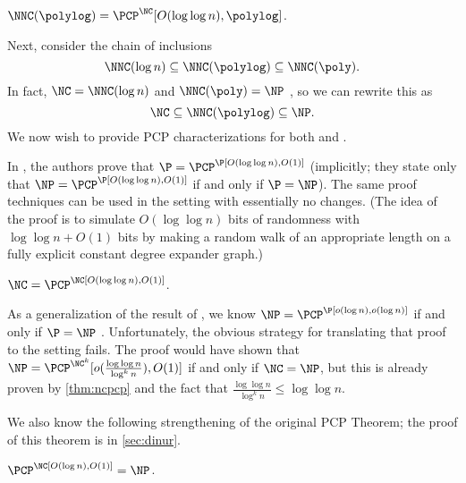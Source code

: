 \documentclass{article}
\newcommand{\loglog}{\log\log}
\begin{document}
\begin{corollary}\label{cor:polylogeq}
  $\NNC(\polylog) = \PCP^{\NC}[O(\loglog n), \polylog]$.
\end{corollary}

Next, consider the chain of inclusions
\begin{equation*}
  \NNC(\log n) \subseteq \NNC(\polylog) \subseteq \NNC(\poly).
\end{equation*}
In fact, $\NC = \NNC(\log n)$ and $\NNC(\poly) = \NP$ \autocite{wolf94}, so we can rewrite this as
\begin{equation}\label{eq:chain}
  \NC \subseteq \NNC(\polylog) \subseteq \NP.
\end{equation}
We now wish to provide \NC{} PCP characterizations for both \NC{} and \NP{}.

In \autocite{fs96}, the authors prove that $\P = \PCP^\P[O(\loglog n), O(1)]$ (implicitly; they state only that $\NP = \PCP^\P[O(\loglog n), O(1)]$ if and only if $\P = \NP$).
The same proof techniques can be used in the \NC{} setting with essentially no changes.
(The idea of the proof is to simulate $O(\loglog n)$ bits of randomness with $\loglog n + O(1)$ bits by making a random walk of an appropriate length on a fully explicit constant degree expander graph.)

\begin{theorem}\label{thm:ncpcp}
  $\NC = \PCP^\NC[O(\loglog n), O(1)]$.
\end{theorem}

As a generalization of the result of \autocite{fs96}, we know $\NP = \PCP^\P[o(\log n), o(\log n)]$ if and only if $\P = \NP$ \autocites{as98}{fglss91}.
Unfortunately, the obvious strategy for translating that proof to the \NC{} setting fails.
The proof would have shown that $\NP = \PCP^{\NC^k}[o(\frac{\loglog n}{\log^k n}), O(1)]$ if and only if $\NC = \NP$, but this is already proven by \autoref{thm:ncpcp} and the fact that $\frac{\loglog n}{\log^k n} \leq \loglog n$.

We also know the following strengthening of the original PCP Theorem; the proof of this theorem is in \autoref{sec:dinur}.
\begin{theorem}\label{thm:pcpnp}
  $\PCP^\NC[O(\log n), O(1)] = \NP$.
\end{theorem}
\end{document}
